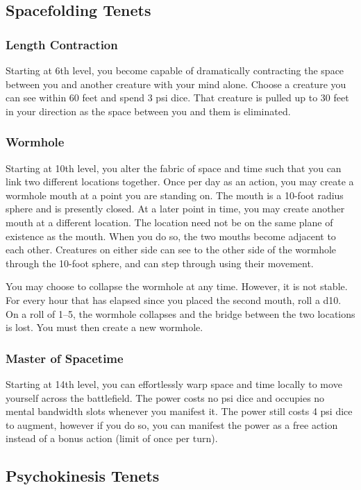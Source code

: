 \subsection{Spacefolding Tenets}
\subsubsection{Length Contraction}
Starting at 6th level,
you become capable of dramatically contracting the space between you
and another creature with your mind alone. 
Choose a creature you can see within 60 feet and spend 3 psi dice.
That creature is pulled up to 30 feet in your direction as the space
between you and them is eliminated.

\subsubsection{Wormhole}
Starting at 10th level,
you alter the fabric of space and time such that
you can link two different locations together.
Once per day as an action,
you may create a wormhole mouth at a point you are standing on.
The mouth is a 10-foot radius sphere and is presently closed.
At a later point in time,
you may create another mouth at a different location.
The location need not be on the same plane of existence
as the mouth.
When you do so, the two mouths become adjacent to each other.
Creatures on either side can see to the other side of the wormhole
through the 10-foot sphere,
and can step through using their movement.

You may choose to collapse the wormhole at any time.
However, it is not stable.
For every hour that has elapsed since you placed the second mouth,
roll a d10.
On a roll of 1--5,
the wormhole collapses and the bridge between the two locations
is lost.
You must then create a new wormhole.

\subsubsection{Master of Spacetime}
Starting at 14th level,
you can effortlessly warp space and time locally to
move yourself across the battlefield.
The  power costs no psi dice
and occupies no mental bandwidth slots
whenever you manifest it.
The power still costs 4 psi dice to augment,
however if you do so,
you can manifest the power as a free action
instead of a bonus action
(limit of once per turn).

\subsection{Psychokinesis Tenets}
